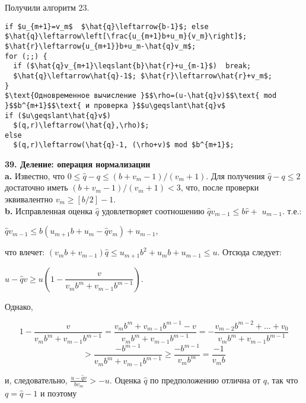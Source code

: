 \noindent
Получили алгоритм 23.
\begin{lstlisting}[mathescape=true, caption={Частные и остатки от деления $(u_{m+1}...u_0)$ на $(v_m...v_0)$, где $u/v<b. n\geqslant1$}]
if $u_{m+1}=v_m$  $\hat{q}\leftarrow{b-1}$; else  $\hat{q}\leftarrow\left[\frac{u_{m+1}b+u_m}{v_m}\right]$;
$\hat{r}\leftarrow{u_{m+1}}b+u_m-\hat{q}v_m$;
for (;;) {
  if ($\hat{q}v_{m+1}\leqslant{b}\hat{r}+u_{m-1}$)  break;
  $\hat{q}\leftarrow\hat{q}-1$; $\hat{r}\leftarrow\hat{r}+v_m$;
}
$\text{Одновременное вычисление }$$\rho=(u-\hat{q}v)$$\text{ mod }$$b^{m+1}$$\text{ и проверка }$$u\geqslant\hat{q}v$
if ($u\geqslant\hat{q}v$)
  $(q,r)\leftarrow(\hat{q},\rho)$;
else
  $(q,r)\leftarrow(\hat{q}-1, (\rho+v)$ mod $b^{m+1}$;
\end{lstlisting}
\textbf{39. Деление: операция нормализации}\\
\hspace*{15pt}\textbf{a.} Известно, что $0\leqslant\hat{q}-q\leqslant(b+v_m-1)/(v_m+1)$. Для получения\linebreak
$\hat{q}-q\leqslant2$ достаточно иметь $(b+v_m-1)/(v_m+1)<3$, что, после проверки\linebreak
эквивалентно $v_m\geqslant[b/2]-1$.\\

\textbf{b.} Исправленная оценка $\hat{q}$ удовлетворяет соотношению $\hat{q}v_{m-1}\leqslant{b}\hat{r}+$\linebreak
$u_{m-1}$. т.е.:
\begin{center}
$\hat{q}v_{m-1}\leqslant{b}(u_{m+1}b+u_m-\hat{q}v_m)+u_{m-1}$,
\end{center}
что влечет: $(v_mb+v_{m-1})\hat{q}\leqslant{u_{m+1}}b^2+u_mb+u_{m-1}\leqslant{u}$. Отсюда следует:\linebreak
\begin{center}
$u-\hat{q}v\geqslant{u(1-\dfrac{v}{v_mb^m+v_{m-1}b^{m-1}})}$.
\end{center}

\newpage

\noindent Однако,

$$
1-\dfrac{v}{v_mb^m+v_{m-1}b^{m-1}} = \dfrac{v_mb^m+v_{m-1}b^{m-1}-v}{v_mb^m+v_{m-1}b^{m-1}} = - \dfrac{v_{m-2}b^{m-2}+...+v_0}{v_mb^m+v_{m-1}b^{m-1}}
$$ \linebreak 
$$ > \dfrac{-b^{m-1}}{v_mb^m+v_{m-1}b^{m-1}} \ge \dfrac{-b^{m-1}}{v_mb^m} = \dfrac{-1}{v_mb}
$$

\noindent и, следовательно, $\frac{u-\hat{q}v}{bv_m} > -u$. Оценка $\hat{q}$ по предположению отлична от $q$, так что $q = \hat{q}-1$ и поэтому

